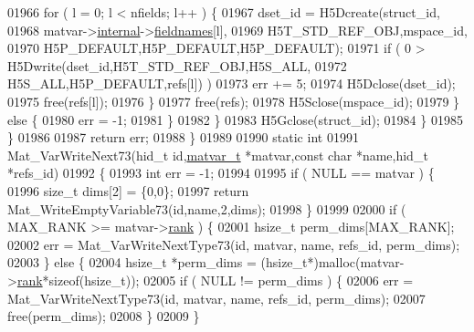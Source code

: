 \begin{DoxyCode}
{{{{{{01966                     \textcolor{keywordflow}{for} ( l = 0; l < nfields; l++ ) \{
01967                         dset\_id = H5Dcreate(struct\_id,
01968                                             matvar->\hyperlink{group___m_a_t_a6e97e3ed9f40c49322c18561c2a94e92}{internal}->\hyperlink{structmatvar__internal_a7574d000bfc98ad4860ae6590b8d4985}{fieldnames}[l],
01969                                             H5T\_STD\_REF\_OBJ,mspace\_id,
01970                                             H5P\_DEFAULT,H5P\_DEFAULT,H5P\_DEFAULT);
01971                         \textcolor{keywordflow}{if} ( 0 > H5Dwrite(dset\_id,H5T\_STD\_REF\_OBJ,H5S\_ALL,
01972                                           H5S\_ALL,H5P\_DEFAULT,refs[l]) )
01973                             err += 5;
01974                         H5Dclose(dset\_id);
01975                         free(refs[l]);
01976                     \}
01977                     free(refs);
01978                     H5Sclose(mspace\_id);
01979                 \} \textcolor{keywordflow}{else} \{
01980                     err = -1;
01981                 \}
01982             \}
01983             H5Gclose(struct\_id);
01984         \}
01985     \}
01986 
01987     \textcolor{keywordflow}{return} err;
01988 \}
01989 
01990 \textcolor{keyword}{static} \textcolor{keywordtype}{int}
01991 Mat\_VarWriteNext73(hid\_t \textcolor{keywordtype}{id},\hyperlink{group___m_a_t_structmatvar__t}{matvar\_t} *matvar,\textcolor{keyword}{const} \textcolor{keywordtype}{char} *name,hid\_t *refs\_id)
01992 \{
01993     \textcolor{keywordtype}{int} err = -1;
01994 
01995     \textcolor{keywordflow}{if} ( NULL == matvar ) \{
01996         \textcolor{keywordtype}{size\_t} dims[2] = \{0,0\};
01997         \textcolor{keywordflow}{return} Mat\_WriteEmptyVariable73(\textcolor{keywordtype}{id},name,2,dims);
01998     \}
01999 
02000     \textcolor{keywordflow}{if} ( MAX\_RANK >= matvar->\hyperlink{group___m_a_t_a84ba70c96ded13cc555fa75b768d9921}{rank} ) \{
02001         hsize\_t perm\_dims[MAX\_RANK];
02002         err = Mat\_VarWriteNextType73(\textcolor{keywordtype}{id}, matvar, name, refs\_id, perm\_dims);
02003     \} \textcolor{keywordflow}{else} \{
02004         hsize\_t *perm\_dims = (hsize\_t*)malloc(matvar->\hyperlink{group___m_a_t_a84ba70c96ded13cc555fa75b768d9921}{rank}*\textcolor{keyword}{sizeof}(hsize\_t));
02005         \textcolor{keywordflow}{if} ( NULL != perm\_dims ) \{
02006             err = Mat\_VarWriteNextType73(\textcolor{keywordtype}{id}, matvar, name, refs\_id, perm\_dims);
02007             free(perm\_dims);
02008         \}
02009     \}
}}}}}}
\end{DoxyCode}
